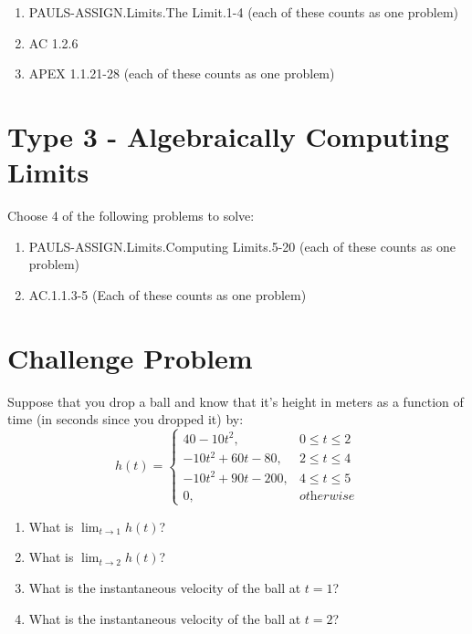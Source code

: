 \documentclass[12pt]{article}
\begin{document}
\begin{enumerate}
  \item PAULS-ASSIGN.Limits.The Limit.1-4 (each of these counts as one problem)
  \item AC 1.2.6
  \item APEX 1.1.21-28 (each of these counts as one problem)
\end{enumerate}

\section{Type 3 - Algebraically Computing Limits}
Choose 4 of the following problems to solve:
\begin{enumerate}
  \item PAULS-ASSIGN.Limits.Computing Limits.5-20 (each of these counts as one problem)
  \item AC.1.1.3-5 (Each of these counts as one problem)
\end{enumerate}

\section{Challenge Problem}

Suppose that you drop a ball and know that it's height in meters
as a function of time (in seconds since you dropped it) by:
\begin{equation}
  h(t) = \begin{cases} 40 - 10t^2, & 0 \leq t \leq 2 \\ -10t^2 + 60t - 80, & 2 \leq t \leq 4 \\ -10t^2 + 90t - 200, & 4 \leq t \leq 5 \\ 0, & \textit{otherwise} \end{cases}
\end{equation}

\begin{enumerate}
  \item What is $\lim_{t \rightarrow 1} h(t)$?
  \item What is $\lim_{t \rightarrow 2} h(t)$?
  \item What is the instantaneous velocity of the ball at $t = 1$?
  \item What is the instantaneous velocity of the ball at $t = 2$?
\end{enumerate}
\end{document}
